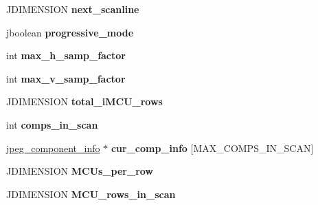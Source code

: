 \begin{DoxyCompactItemize}
\item 
J\+D\+I\+M\+E\+N\+S\+I\+ON {\bfseries next\+\_\+scanline}\hypertarget{structjpeg__compress__struct_aefb3f2e6479374ba03e7d0421dcfb086}{}\label{structjpeg__compress__struct_aefb3f2e6479374ba03e7d0421dcfb086}

\item 
jboolean {\bfseries progressive\+\_\+mode}\hypertarget{structjpeg__compress__struct_a2640a0ab479c0bb4082ef0f15b7252e2}{}\label{structjpeg__compress__struct_a2640a0ab479c0bb4082ef0f15b7252e2}

\item 
int {\bfseries max\+\_\+h\+\_\+samp\+\_\+factor}\hypertarget{structjpeg__compress__struct_ae8de4e6079b80e3a81135d07934c640d}{}\label{structjpeg__compress__struct_ae8de4e6079b80e3a81135d07934c640d}

\item 
int {\bfseries max\+\_\+v\+\_\+samp\+\_\+factor}\hypertarget{structjpeg__compress__struct_a9e03a4eb7af87c682937caed3d341d4a}{}\label{structjpeg__compress__struct_a9e03a4eb7af87c682937caed3d341d4a}

\item 
J\+D\+I\+M\+E\+N\+S\+I\+ON {\bfseries total\+\_\+i\+M\+C\+U\+\_\+rows}\hypertarget{structjpeg__compress__struct_aef01162f4c66434929f933a40e695f9e}{}\label{structjpeg__compress__struct_aef01162f4c66434929f933a40e695f9e}

\item 
int {\bfseries comps\+\_\+in\+\_\+scan}\hypertarget{structjpeg__compress__struct_a3387358088abbec1c8838499966c8f06}{}\label{structjpeg__compress__struct_a3387358088abbec1c8838499966c8f06}

\item 
\hyperlink{structjpeg__component__info}{jpeg\+\_\+component\+\_\+info} $\ast$ {\bfseries cur\+\_\+comp\+\_\+info} \mbox{[}M\+A\+X\+\_\+\+C\+O\+M\+P\+S\+\_\+\+I\+N\+\_\+\+S\+C\+AN\mbox{]}\hypertarget{structjpeg__compress__struct_a1cacb367b7d69227d3086ff105bca9ab}{}\label{structjpeg__compress__struct_a1cacb367b7d69227d3086ff105bca9ab}

\item 
J\+D\+I\+M\+E\+N\+S\+I\+ON {\bfseries M\+C\+Us\+\_\+per\+\_\+row}\hypertarget{structjpeg__compress__struct_a97f0c5e0ae932d1810007077443da684}{}\label{structjpeg__compress__struct_a97f0c5e0ae932d1810007077443da684}

\item 
J\+D\+I\+M\+E\+N\+S\+I\+ON {\bfseries M\+C\+U\+\_\+rows\+\_\+in\+\_\+scan}\hypertarget{structjpeg__compress__struct_ab605396740a26114095bf99c7c7349fb}{}\label{structjpeg__compress__struct_ab605396740a26114095bf99c7c7349fb}


\end{DoxyCompactItemize}
